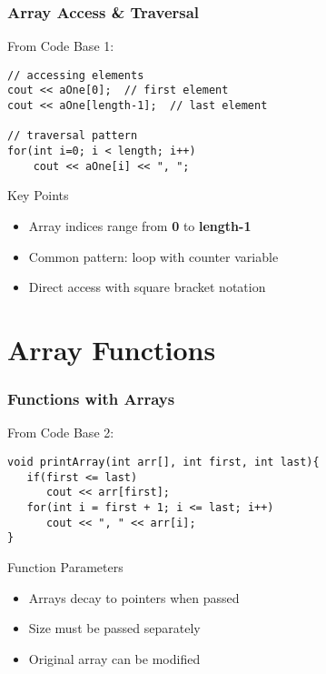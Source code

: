 \documentclass[aspectratio=169]{beamer}
\begin{document}
\begin{frame}[fragile]
    \frametitle{Array Access \& Traversal}
    From Code Base 1:
    \begin{lstlisting}
// accessing elements
cout << aOne[0];  // first element
cout << aOne[length-1];  // last element

// traversal pattern
for(int i=0; i < length; i++)
    cout << aOne[i] << ", ";
    \end{lstlisting}
    \pause
    \begin{alertblock}{Key Points}
        \begin{itemize}
            \item Array indices range from \textbf{0} to \textbf{length-1}
            \item Common pattern: loop with counter variable
            \item Direct access with square bracket notation
        \end{itemize}
    \end{alertblock}
\end{frame}

\section{Array Functions}

\begin{frame}[fragile]
    \frametitle{Functions with Arrays}
    From Code Base 2:
    \begin{lstlisting}
void printArray(int arr[], int first, int last){
   if(first <= last)
      cout << arr[first];
   for(int i = first + 1; i <= last; i++)
      cout << ", " << arr[i];
}
    \end{lstlisting}
    \pause
    \begin{exampleblock}{Function Parameters}
        \begin{itemize}
            \item Arrays decay to pointers when passed
            \item Size must be passed separately
            \item Original array can be modified
        \end{itemize}
    \end{exampleblock}
\end{frame}
\end{document}

